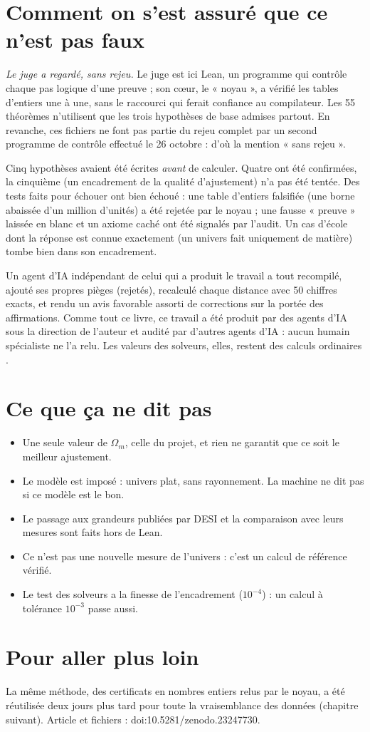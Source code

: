\section*{Comment on s'est assuré que ce n'est pas faux}

 \emph{Le juge a regardé, sans rejeu.} Le juge est ici Lean, un programme qui contrôle chaque pas logique
d'une preuve ; son cœur, le « noyau », a vérifié les tables d'entiers une à une, sans le raccourci qui ferait
confiance au compilateur. Les 55 théorèmes n'utilisent que les trois hypothèses de base admises partout. En revanche,
ces fichiers ne font pas partie du rejeu complet par un second programme de contrôle effectué le 26 octobre : d'où la
mention « sans rejeu ».

Cinq hypothèses avaient été écrites \emph{avant} de calculer. Quatre ont été confirmées, la cinquième (un encadrement
de la qualité d'ajustement) n'a pas été tentée. Des tests faits pour échouer ont bien échoué : une table d'entiers
falsifiée (une borne abaissée d'un million d'unités) a été rejetée par le noyau ; une fausse « preuve » laissée en
blanc et un axiome caché ont été signalés par l'audit. Un cas d'école dont la réponse est connue exactement (un univers
fait uniquement de matière) tombe bien dans son encadrement.

Un agent d'IA indépendant de celui qui a produit le travail a tout recompilé, ajouté ses propres pièges (rejetés),
recalculé chaque distance avec 50 chiffres exacts, et rendu un avis favorable assorti de corrections sur la portée des
affirmations. Comme tout ce livre, ce travail a été produit par des agents d'IA sous la direction de l'auteur et
audité par d'autres agents d'IA : aucun humain spécialiste ne l'a relu. Les valeurs des solveurs, elles, restent des
calculs ordinaires .

\section*{Ce que ça ne dit pas}

\begin{limite}
\begin{itemize}
\item Une seule valeur de $\Omega_m$, celle du projet, et rien ne garantit que ce soit le meilleur ajustement.
\item Le modèle est imposé : univers plat, sans rayonnement. La machine ne dit pas si ce modèle est le bon.
\item Le passage aux grandeurs publiées par DESI et la comparaison avec leurs mesures sont faits hors de Lean.
\item Ce n'est pas une nouvelle mesure de l'univers : c'est un calcul de référence vérifié.
\item Le test des solveurs a la finesse de l'encadrement ($10^{-4}$) : un calcul à tolérance $10^{-3}$ passe aussi.
\end{itemize}
\end{limite}

\section*{Pour aller plus loin}

La même méthode, des certificats en nombres entiers relus par le noyau, a été réutilisée deux jours plus tard pour
toute la vraisemblance des données (chapitre suivant). Article et fichiers : doi:10.5281/zenodo.23247730.
